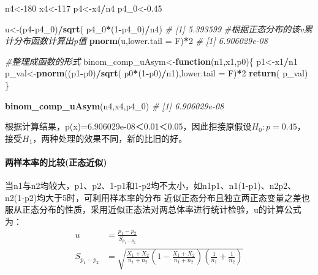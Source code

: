 \documentclass[
]{article}
\newenvironment{Shaded}{\begin{snugshade}}{\end{snugshade}}
\newcommand{\CommentTok}[1]{\textcolor[rgb]{0.56,0.35,0.01}{\textit{#1}}}
\newcommand{\ControlFlowTok}[1]{\textcolor[rgb]{0.13,0.29,0.53}{\textbf{#1}}}
\newcommand{\DataTypeTok}[1]{\textcolor[rgb]{0.13,0.29,0.53}{#1}}
\newcommand{\DecValTok}[1]{\textcolor[rgb]{0.00,0.00,0.81}{#1}}
\newcommand{\FloatTok}[1]{\textcolor[rgb]{0.00,0.00,0.81}{#1}}
\newcommand{\KeywordTok}[1]{\textcolor[rgb]{0.13,0.29,0.53}{\textbf{#1}}}
\newcommand{\NormalTok}[1]{#1}
\newcommand{\OperatorTok}[1]{\textcolor[rgb]{0.81,0.36,0.00}{\textbf{#1}}}
\begin{document}
\begin{Shaded}
\begin{Highlighting}[]
\NormalTok{n4<-}\DecValTok{180}
\NormalTok{x4<-}\DecValTok{117}
\NormalTok{p4<-x4}\OperatorTok{/}\NormalTok{n4}
\NormalTok{p4_}\DecValTok{0}\NormalTok{<-}\FloatTok{0.45}

\NormalTok{u<-(p4}\OperatorTok{-}\NormalTok{p4_}\DecValTok{0}\NormalTok{)}\OperatorTok{/}\KeywordTok{sqrt}\NormalTok{( p4_}\DecValTok{0}\OperatorTok{*}\NormalTok{(}\DecValTok{1}\OperatorTok{-}\NormalTok{p4_}\DecValTok{0}\NormalTok{)}\OperatorTok{/}\NormalTok{n4)}
\CommentTok{# [1] 5.393599}
\CommentTok{#根据正态分布的该v累计分布函数计算出p值}
\KeywordTok{pnorm}\NormalTok{(u,}\DataTypeTok{lower.tail =}\NormalTok{ F)}\OperatorTok{*}\DecValTok{2}
\CommentTok{# [1] 6.906029e-08}

\CommentTok{#整理成函数的形式}
\NormalTok{binom_comp_uAsym<-}\ControlFlowTok{function}\NormalTok{(n1,x1,p0)\{}
\NormalTok{  p1<-x1}\OperatorTok{/}\NormalTok{n1}
\NormalTok{  p_val<-}\KeywordTok{pnorm}\NormalTok{((p1}\OperatorTok{-}\NormalTok{p0)}\OperatorTok{/}\KeywordTok{sqrt}\NormalTok{( p0}\OperatorTok{*}\NormalTok{(}\DecValTok{1}\OperatorTok{-}\NormalTok{p0)}\OperatorTok{/}\NormalTok{n1),}\DataTypeTok{lower.tail =}\NormalTok{ F)}\OperatorTok{*}\DecValTok{2}
  \KeywordTok{return}\NormalTok{( p_val)}
\NormalTok{\}}

\KeywordTok{binom_comp_uAsym}\NormalTok{(n4,x4,p4_}\DecValTok{0}\NormalTok{)}
\CommentTok{# [1] 6.906029e-08}
\end{Highlighting}
\end{Shaded}

根据计算结果，p(x)=6.906029e-08＜0.01＜0.05，因此拒接原假设\(H_0:p=0.45\)，接受\(H_1\)，两种处理的效果不同，新的比旧的好。

\hypertarget{ux4e24ux6837ux672cux7387ux7684ux6bd4ux8f83ux6b63ux6001ux8fd1ux4f3c}{%
\paragraph{两样本率的比较(正态近似)}\label{ux4e24ux6837ux672cux7387ux7684ux6bd4ux8f83ux6b63ux6001ux8fd1ux4f3c}}

当n1与n2均较大，p1、p2、1-p1和1-p2均不太小，如n1p1、n1(1-p1)、n2p2、n2(1-p2)均大于5时，可利用样本率的分布
近似正态分布且独立两正态变量之差也服从正态分布的性质，采用近似正态法对两总体率进行统计检验，u的计算公式为：
\[\begin{aligned}
u &= \frac{p_1-p_2}{S_{p_1-p_2}}\\
S_{p_1-p_2} &= \sqrt{\frac{X_1+X_2}{n_1+n_2}(1-\frac{X_1+X_2}{n_1+n_2})(\frac{1}{n_1}+\frac{1}{n_2})}
\end{aligned}\]
\end{document}
